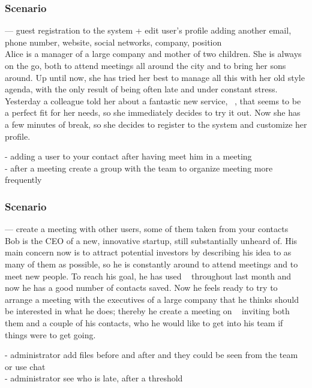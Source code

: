 
\subsubsection{Scenario \thecountScenarios }
--- guest registration  to the system + edit user's profile adding another email, phone number, website, social networks, company, position \\

Alice is a manager of a large company and mother of two children. She is always on the go, both to attend meetings all around the city and to bring her sons around. Up until now, she has tried her best to manage all this with her old style agenda, with the only result of being often late and under constant stress. Yesterday a colleague told her about a fantastic new service, \projectname~, that seems to be a perfect fit for her needs, so she immediately decides to try it out. Now she has a few minutes of break, so she decides to register to the system and customize her profile.

- adding a user to your contact after having meet him in a meeting \\
- after a meeting create a group with the team to organize meeting more frequently \\


\subsubsection{Scenario \thecountScenarios }
--- create a meeting with other users, some of them taken from your contacts\\

Bob is the CEO of a new, innovative startup, still substantially unheard of. His main concern now is to attract potential investors by describing his idea to as many of them as possible, so he is constantly around to attend meetings and to meet new people. To reach his goal, he has used \projectname~ throughout last month and now he has a good number of contacts saved. Now he feels ready to try to arrange a meeting with the executives of a large company that he thinks should be interested in what he does; thereby he create a meeting on \projectname~ inviting both them and a couple of his contacts, who he would like to get into his team if things were to get going.

- administrator add files before and after and they could be seen from the team or use chat\\
- administrator see who is late, after a threshold\\


